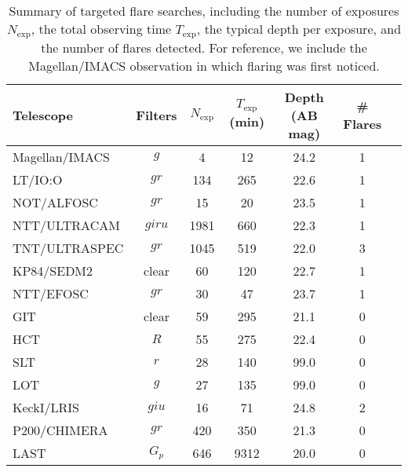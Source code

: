 \documentclass{nature_plusfigure}
\begin{document}
\begin{extended_data}
\begin{table}
\begin{center}
\caption{Summary of targeted flare searches, including the number of exposures $N_\mathrm{exp}$, the total observing time $T_\mathrm{exp}$, the typical depth per exposure, and the number of flares detected. For reference, we include the Magellan/IMACS observation in which flaring was first noticed.}
\label{tab:flare-searches}
\begin{tabular}{lcccccc} 
\hline\hline
Telescope & Filters & $N_\mathrm{exp}$ & $T_\mathrm{exp}$ (min) & Depth (AB mag) & \# Flares \\
\hline
Magellan/IMACS & $g$ & 4 & 12 & 24.2 & 1 \\
LT/IO:O & $gr$ & 134 & 265 & 22.6 & 1 \\
NOT/ALFOSC & $gr$ & 15 & 20 & 23.5 & 1 \\
NTT/ULTRACAM & $giru$ & 1981 & 660 & 22.3 & 1 \\
TNT/ULTRASPEC & $gr$ & 1045 & 519 & 22.0 & 3 \\
KP84/SEDM2 & clear & 60 & 120 & 22.7 & 1 \\
NTT/EFOSC & $gr$ & 30 & 47 & 23.7 & 1 \\
GIT & clear & 59 & 295 & 21.1 & 0 \\
HCT & $R$ & 55 & 275 & 22.4 & 0 \\
SLT & $r$ & 28 & 140 & 99.0 & 0 \\
LOT & $g$ & 27 & 135 & 99.0 & 0 \\
KeckI/LRIS & $giu$ & 16 & 71 & 24.8 & 2 \\
P200/CHIMERA & $gr$ & 420 & 350 & 21.3 & 0 \\
LAST & $G_p$ & 646 & 9312 & 20.0 & 0 \\
\hline
\end{tabular}
\end{center}
\end{table}


\end{extended_data}
\end{document}
